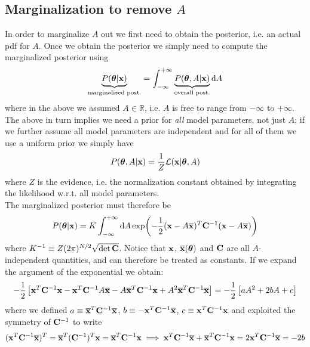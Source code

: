 \documentclass[a4paper]{article}
\newcommand{\R}{\mathbb{R}}
\newcommand{\mat}[1]{\vb{#1}}
\newcommand{\quadre}[1]{\left[ {#1} \right]}
\renewcommand{\L}{\mathcal{L}}%
\begin{document}
\subsection{Marginalization to remove $A$}
In order to marginalize $A$ out we first need to obtain the posterior, i.e. an actual pdf for $A$. Once we obtain the posterior we simply need to compute the marginalized posterior using
\begin{equation*}
    \underbrace{P(\vb*{\theta}|\vb{x})}_{\text{marginalized post.}} = \int_{-\infty}^{+\infty} \underbrace{P(\vb*{\theta},A|\vb{x})}_{\text{overall post.}} \dd{A}
\end{equation*}
where in the above we assumed $A\in\R$, i.e. $A$ is free to range from $-\infty$ to $+\infty$.\\
The above in turn implies we need a prior for \emph{all} model parameters, not just $A$; if we further assume all model parameters are independent and for all of them we use a uniform prior we simply have
\begin{equation*}
    P(\vb*{\theta},A|\vb{x}) = \frac{1}{Z}\L(\vb{x}|\vb*{\theta}, A)
\end{equation*}
where $Z$ is the evidence, i.e. the normalization constant obtained by integrating the likelihood w.r.t. all model parameters.\\
The marginalized posterior must therefore be
\begin{equation*}
    P(\vb*{\theta}|\vb{x}) = K \int_{-\infty}^{+\infty} \dd{A} \exp(-\frac{1}{2}(\vb{x} - A\overline{\vb{x}})^T \mat{C}^{-1}(\vb{x} - A\overline{\vb{x}}))
\end{equation*}
where $K^{-1} \equiv Z (2\pi)^{N/2} \sqrt{\det\mat{C}}$. Notice that $\vb{x}$, $\overline{\vb{x}}(\vb*{\theta})$ and $\mat{C}$ are all $A$-independent quantities, and can therefore be treated as constants. If we expand the argument of the exponential we obtain:
\begin{equation*}
    -\frac{1}{2}\quadre{\vb{x}^T\mat{C}^{-1}\vb{x} - \vb{x}^T\mat{C}^{-1}A\overline{\vb{x}} - A\overline{\vb{x}}^T \mat{C}^{-1}\vb{x} + A^2 \overline{\vb{x}}^T \mat{C}^{-1} \overline{\vb{x}}} = -\frac{1}{2}\quadre{aA^2 + 2bA + c}
\end{equation*}
where we defined $a \equiv \overline{\vb{x}}^T \mat{C}^{-1} \overline{\vb{x}}$, $b \equiv - \vb{x}^T\mat{C}^{-1}\overline{\vb{x}}$, $c\equiv \vb{x}^T \mat{C}^{-1}\vb{x}$ and exploited the symmetry of $\mat{C}^{-1}$ to write
\begin{equation*}
    (\vb{x}^T\mat{C}^{-1}\overline{\vb{x}})^T = \overline{\vb{x}}^T(\mat{C}^{-1})^T\vb{x} = \overline{\vb{x}}^T\mat{C}^{-1}\vb{x} \implies \vb{x}^T\mat{C}^{-1}\overline{\vb{x}} + \overline{\vb{x}}^T\mat{C}^{-1}\vb{x} = 2\vb{x}^T\mat{C}^{-1}\overline{\vb{x}} = -2b
\end{equation*}
\end{document}
